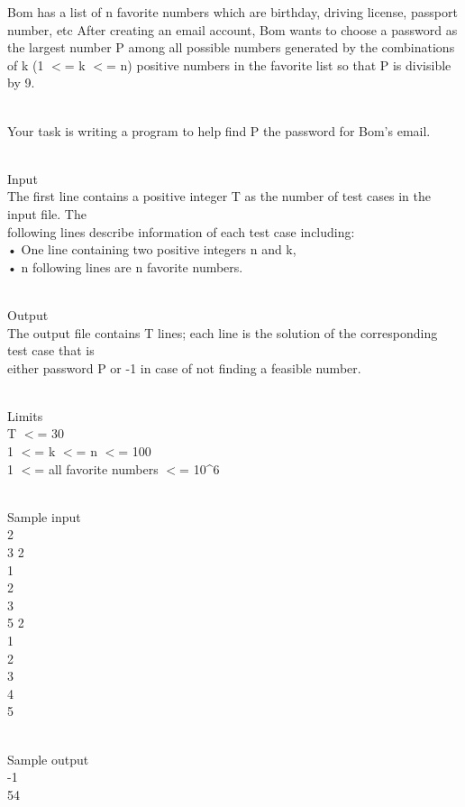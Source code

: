 



   Bom has a list of n favorite numbers which are birthday, driving license, passport number, etc After creating an email account, Bom wants to choose a password as the largest number P among all possible numbers generated by the combinations of k (1 $<$= k $<$= n) positive numbers in the favorite list so that P is divisible by 9.  


\\   Your task is writing a program to help find P the password for Bom’s email.  


\\   Input   
\\   The first line contains a positive integer T as the number of test cases in the input file. The   
\\   following lines describe information of each test case including:   
\\   • One line containing two positive integers n and k,   
\\   • n following lines are n favorite numbers.  


\\   Output   
\\   The output file contains T lines; each line is the solution of the corresponding test case that is   
\\   either password P or -1 in case of not finding a feasible number.  


\\   Limits   
\\   T $<$= 30   
\\   1 $<$= k $<$= n $<$= 100   
\\   1 $<$= all favorite numbers $<$= 10\textasciicircum6  


\\   Sample input   
\\   2   
\\   3 2   
\\   1   
\\   2   
\\   3   
\\   5 2   
\\   1   
\\   2   
\\   3   
\\   4   
\\   5  


\\   Sample output   
\\   -1   
\\   54  